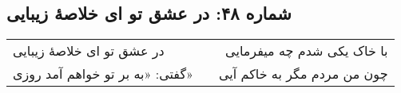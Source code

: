 \begin{center}
\section*{شماره ۴۸: در عشق تو ای خلاصۀ زیبایی}
\label{sec:048}
\begin{longtable}{l p{0.5cm} r}
در عشق تو ای خلاصهٔ زیبایی
&&
با خاک یکی شدم چه میفرمایی
\\
گفتی: «به بر تو خواهم آمد روزی»
&&
چون من مردم مگر به خاکم آیی
\\
\end{longtable}
\end{center}
